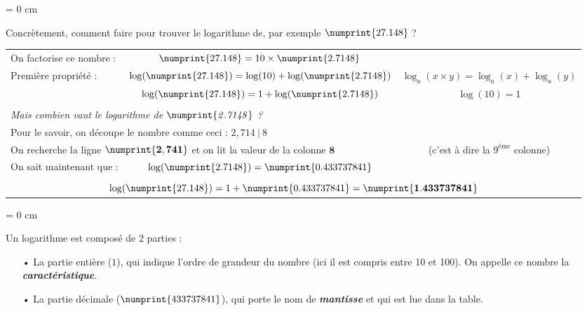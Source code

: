 \documentclass[a4paper]{article}
\begin{document}
{ \parindent = 0 cm

Concrètement, comment faire pour trouver le logarithme de, par exemple $\numprint{27.148}$ ?

\vspace{0.2 cm}

\begin{tabular}{lc|c}

On factorise ce nombre : & $\numprint{27.148} = 10 \times \numprint{2.7148}$ & \\


Première propriété : & $\log(\numprint{27.148}) = \log(10) + \log(\numprint{2.7148})$ & $ \log_a ( x \times y ) = \log_a (x) + \log_a (y) $\\

& $\log(\numprint{27.148}) =1 + \log(\numprint{2.7148})$ & $ \log (10) = 1 $\\

&& \\

\multicolumn{2}{l|}{ \textit{Mais combien vaut le logarithme de $\mathit{\numprint{2.7148}}$ ?} } &\\


\multicolumn{2}{l|}{ Pour le savoir, on découpe le nombre comme ceci : $2,714~|~8$} & \\



\multicolumn{2}{l|}{On recherche la ligne $\mathbf{\numprint{2,741}}$ et on lit la valeur de la colonne $\mathbf{8}$} & (c'est à dire la $9^{\text{ème}}$ colonne)\\


On sait maintenant que : & $\log (\numprint{2.7148}) = \numprint{0.433 737 841}$ & \\

\multicolumn{3}{c}{} \\

\multicolumn{3}{c}{\large $\log(\numprint{27.148}) = 1 + \numprint{0.433 737 841} = \mathbf{\numprint{1.433 737 841}} $}\\

\end{tabular}
}

\vspace{0.3 cm}

{ \parindent = 0 cm

Un logarithme est composé de 2 parties :

\begin{itemize}

	\vspace{0.1 cm}

	\item[•] La partie entière ($1$), qui indique l'ordre de grandeur du nombre (ici il est compris entre 10 et 100). On appelle ce nombre la \textbf{\textit{caractéristique}}.

	\vspace{0.1 cm}

	\item[•] La partie décimale ($\numprint{433 737 841}$), qui porte le nom de \textbf{\textit{mantisse}} et qui est lue dans la table.

\end{itemize}
}
\end{document}
